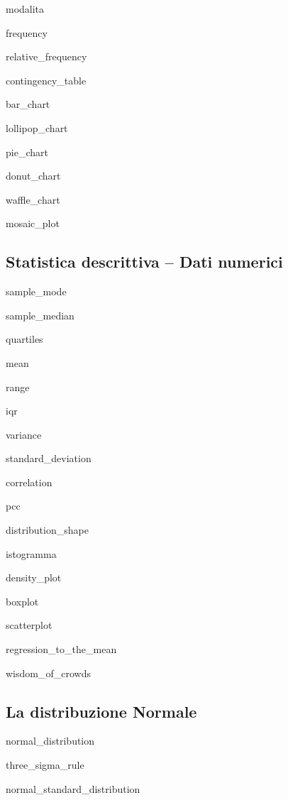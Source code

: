 \documentclass{report}
\begin{document}
\noindent \gls{modalita}

\noindent \gls{frequency}

\noindent \gls{relative_frequency}

\noindent \gls{contingency_table}

\noindent \gls{bar_chart}

\noindent \gls{lollipop_chart}

\noindent \gls{pie_chart}

\noindent \gls{donut_chart}

\noindent \gls{waffle_chart}

\noindent \gls{mosaic_plot}




\subsection*{Statistica descrittiva -- Dati numerici}

\noindent \gls{sample_mode}

\noindent \gls{sample_median}

\noindent \gls{quartiles}

\noindent \gls{mean}

\noindent \gls{range}

\noindent \gls{iqr}

\noindent \gls{variance}

\noindent \gls{standard_deviation}

\noindent \gls{correlation}

\noindent \gls{pcc}

\noindent \gls{distribution_shape}

\noindent \gls{istogramma}

\noindent \gls{density_plot}

\noindent \gls{boxplot}

\noindent \gls{scatterplot}

\noindent \gls{regression_to_the_mean}

\noindent \gls{wisdom_of_crowds}




\subsection*{La distribuzione Normale}

\noindent \gls{normal_distribution}

\noindent \gls{three_sigma_rule}

\noindent \gls{normal_standard_distribution}
\end{document}
